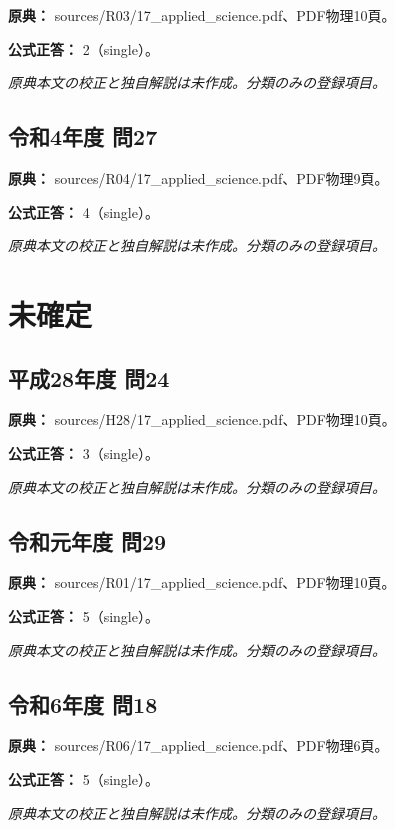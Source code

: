 \noindent\textbf{原典：} sources/R03/17\_applied\_science.pdf、PDF物理10頁。

\textbf{公式正答：} 2（single）。

\par\textit{原典本文の校正と独自解説は未作成。分類のみの登録項目。}

\subsection{令和4年度 問27}
\label{q:r04-reg-applied-27}

\noindent\textbf{原典：} sources/R04/17\_applied\_science.pdf、PDF物理9頁。

\textbf{公式正答：} 4（single）。

\par\textit{原典本文の校正と独自解説は未作成。分類のみの登録項目。}

\section{未確定}

\subsection{平成28年度 問24}
\label{q:h28-reg-applied-24}

\noindent\textbf{原典：} sources/H28/17\_applied\_science.pdf、PDF物理10頁。

\textbf{公式正答：} 3（single）。

\par\textit{原典本文の校正と独自解説は未作成。分類のみの登録項目。}

\subsection{令和元年度 問29}
\label{q:r01-reg-applied-29}

\noindent\textbf{原典：} sources/R01/17\_applied\_science.pdf、PDF物理10頁。

\textbf{公式正答：} 5（single）。

\par\textit{原典本文の校正と独自解説は未作成。分類のみの登録項目。}

\subsection{令和6年度 問18}
\label{q:r06-reg-applied-18}

\noindent\textbf{原典：} sources/R06/17\_applied\_science.pdf、PDF物理6頁。

\textbf{公式正答：} 5（single）。

\par\textit{原典本文の校正と独自解説は未作成。分類のみの登録項目。}
